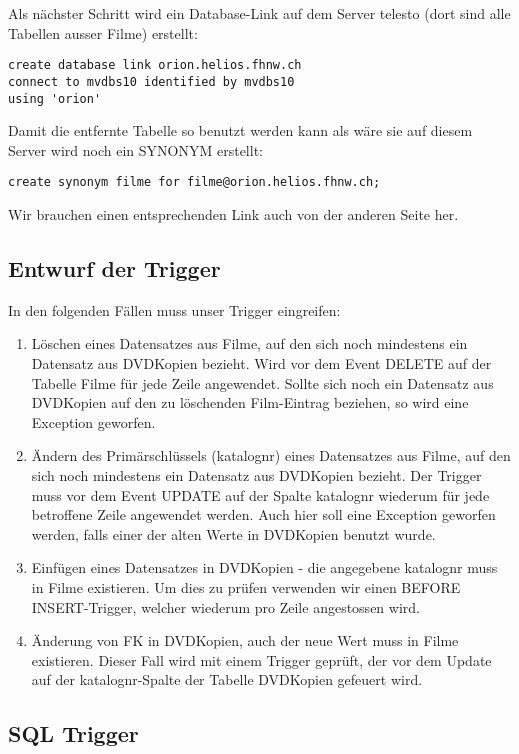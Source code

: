 \documentclass[11pt,a4paper,parskip=half]{scrartcl}
\begin{document}
Als nächster Schritt wird ein Database-Link auf dem Server telesto (dort sind alle Tabellen ausser Filme) erstellt:

\begin{lstlisting}
create database link orion.helios.fhnw.ch
connect to mvdbs10 identified by mvdbs10
using 'orion'
\end{lstlisting}

Damit die entfernte Tabelle so benutzt werden kann als wäre sie auf diesem Server wird noch ein SYNONYM erstellt:
\begin{lstlisting}
create synonym filme for filme@orion.helios.fhnw.ch;
\end{lstlisting}

Wir brauchen einen entsprechenden Link auch von der anderen Seite her.

\subsection{Entwurf der Trigger}
In den folgenden Fällen muss unser Trigger eingreifen:
\begin{enumerate}
	\item{Löschen eines Datensatzes aus Filme, auf den sich noch mindestens ein Datensatz aus DVDKopien bezieht. Wird vor dem Event DELETE auf der Tabelle Filme für jede Zeile angewendet. Sollte sich noch ein Datensatz aus DVDKopien auf den zu löschenden Film-Eintrag beziehen, so wird eine Exception geworfen.}
	\item{Ändern des Primärschlüssels (katalognr) eines Datensatzes aus Filme, auf den sich noch mindestens ein Datensatz aus DVDKopien bezieht. Der Trigger muss vor dem Event UPDATE auf der Spalte katalognr wiederum für jede betroffene Zeile angewendet werden. Auch hier soll eine Exception geworfen werden, falls einer der alten Werte in DVDKopien benutzt wurde.}
	\item{Einfügen eines Datensatzes in DVDKopien - die angegebene katalognr muss in Filme existieren. Um dies zu prüfen verwenden wir einen BEFORE INSERT-Trigger, welcher wiederum pro Zeile angestossen wird.}
	\item{Änderung von FK in DVDKopien, auch der neue Wert muss in Filme existieren. Dieser Fall wird mit einem Trigger geprüft, der vor dem Update auf der katalognr-Spalte der Tabelle DVDKopien gefeuert wird.}
\end{enumerate}

\subsection{SQL Trigger}
\end{document}
